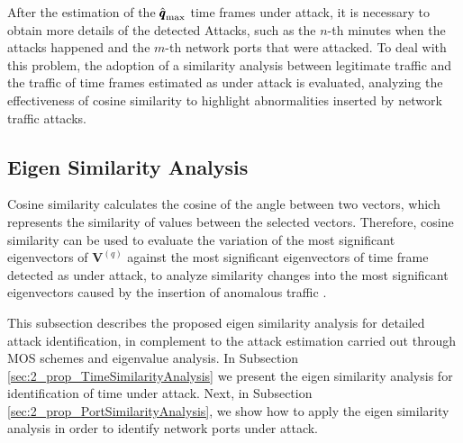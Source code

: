 \begin{algorithm}
	\label{alg:2.01}
\end{algorithm}

After the estimation of the $\rm{\hat{\pmb{q}}}_{\rm max}$ time frames under attack, it is necessary to obtain more details of the detected Attacks, such as the $n$-th minutes when the attacks happened and the $m$-th network ports that were attacked. To deal with this problem, the adoption of a similarity analysis between legitimate traffic and the traffic of time frames estimated as under attack is evaluated, analyzing the effectiveness of cosine similarity to highlight abnormalities inserted by network traffic attacks. 

\subsection{Eigen Similarity Analysis}
\label{sec:2_prop_EigenSimilarityAnalysis}

Cosine similarity calculates the cosine of the angle between two vectors, which represents the similarity of values between the selected vectors. Therefore, cosine similarity can be used to evaluate the variation of the most significant eigenvectors of $\pmb{V}^{(q)}$ against the most significant eigenvectors of time frame detected as under attack, to analyze similarity changes into the most significant eigenvectors caused by the insertion of anomalous traffic \cite{Lee2013}. 

This subsection describes the proposed eigen similarity analysis for detailed attack identification, in complement to the attack estimation carried out through MOS schemes and eigenvalue analysis. In Subsection \ref{sec:2_prop_TimeSimilarityAnalysis} we present the eigen similarity analysis for identification of time under attack. Next, in Subsection \ref{sec:2_prop_PortSimilarityAnalysis}, we show how to apply the eigen similarity analysis in order to identify network ports under attack.

